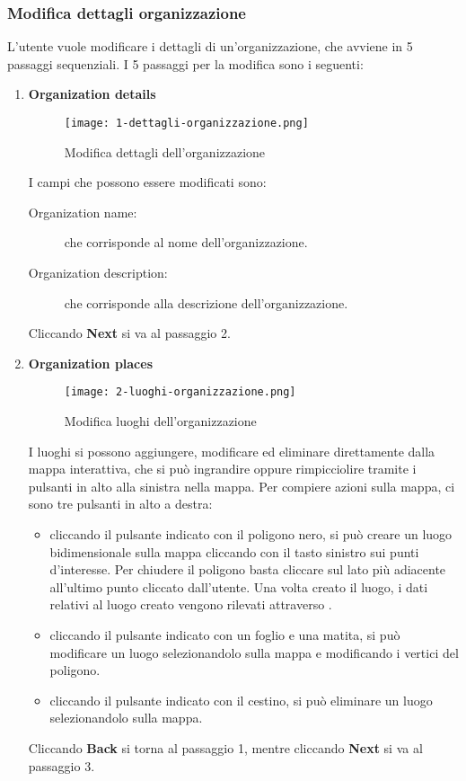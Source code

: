 \documentclass[../manuale-utente.tex]{subfiles}
\begin{document}
\subsubsection{Modifica dettagli organizzazione}%
\label{subs:modififica_dettagli_organizzazione}

L'utente vuole modificare i dettagli di un'organizzazione, che avviene in 5 passaggi sequenziali.
I 5 passaggi per la modifica sono i seguenti:
\begin{enumerate}
    \item \textbf{Organization details}

    \begin{figure}[H]
        \centering
        \texttt{[image: 1-dettagli-organizzazione.png]}
        \caption{Modifica dettagli dell'organizzazione}%
        \label{fig:web_app_modifica_dettagli_organizzazione}
    \end{figure}
    I campi che possono essere modificati sono:
    \begin{description}
        \item[Organization name:] che corrisponde al nome dell'organizzazione.
        \item[Organization description:] che corrisponde alla descrizione dell'organizzazione.
    \end{description}
    Cliccando \textbf{Next} si va al passaggio 2.

    \item \textbf{Organization places}

    \begin{figure}[H]
        \centering
        \texttt{[image: 2-luoghi-organizzazione.png]}
        \caption{Modifica luoghi dell'organizzazione}%
        \label{fig:web_app_modifica_luoghi_organizzazione}
    \end{figure}
    I luoghi si possono aggiungere, modificare ed eliminare direttamente dalla mappa interattiva, che si può ingrandire oppure rimpicciolire tramite i pulsanti in alto alla sinistra nella mappa.
    Per compiere azioni sulla mappa, ci sono tre pulsanti in alto a destra:
    \begin{itemize}
        \item cliccando il pulsante indicato con il poligono nero, si può creare un luogo bidimensionale sulla mappa cliccando con il tasto sinistro sui punti d'interesse. Per chiudere il poligono basta cliccare sul lato più adiacente all'ultimo punto cliccato dall'utente. Una volta creato il luogo, i dati relativi al luogo creato vengono rilevati attraverso .
        \item cliccando il pulsante indicato con un foglio e una matita, si può modificare un luogo selezionandolo sulla mappa e modificando i vertici del poligono.
        \item cliccando il pulsante indicato con il cestino, si può eliminare un luogo selezionandolo sulla mappa.
    \end{itemize}
    Cliccando \textbf{Back} si torna al passaggio 1, mentre cliccando \textbf{Next} si va al passaggio 3.


\end{enumerate}
\end{document}
